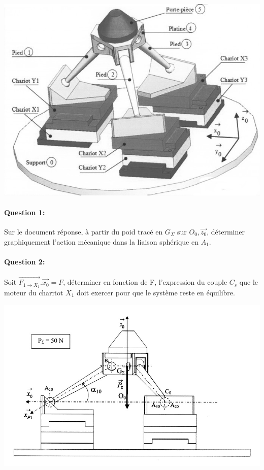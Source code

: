 \begin{center}
\centering\includegraphics[width=0.8\linewidth]{img/Micro2.jpg}
\end{center}

\paragraph{Question 1:} Sur le document réponse, à partir du poid tracé en $G_{\Sigma}$ sur $O_0,\overrightarrow{z_0}$, déterminer graphiquement l'action mécanique dans la liaison sphérique en $A_1$.

\paragraph{Question 2:} Soit $\overrightarrow{F_{1 \rightarrow X_1}}.\overrightarrow{x_0}=F$, déterminer en fonction de F, l'expression du couple $C_s$ que le moteur du charriot $X_1$ doit exercer pour que le système reste en équilibre.

\begin{center}
\centering\includegraphics[width=0.9\linewidth]{img/Micro_DR.jpg}
\end{center}


